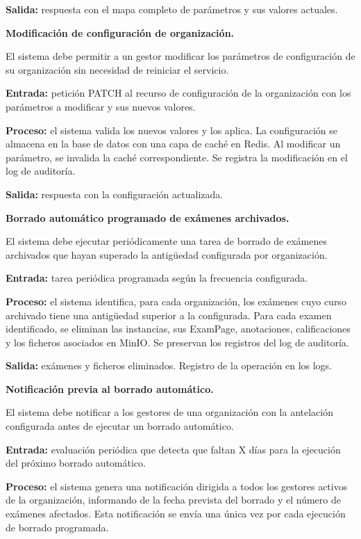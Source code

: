 \begin{functional}
\begin{functional}
    \textbf{Salida:} respuesta con el mapa completo de parámetros y sus valores actuales.

    \item \textbf{Modificación de configuración de organización.}

    El sistema debe permitir a un gestor modificar los parámetros de configuración de su organización sin necesidad de reiniciar el servicio.

    \textbf{Entrada:} petición PATCH al recurso de configuración de la organización con los parámetros a modificar y sus nuevos valores.

    \textbf{Proceso:} el sistema valida los nuevos valores y los aplica. La configuración se almacena en la base de datos con una capa de caché en Redis. Al modificar un parámetro, se invalida la caché correspondiente. Se registra la modificación en el log de auditoría.

    \textbf{Salida:} respuesta con la configuración actualizada.

    \item \textbf{Borrado automático programado de exámenes archivados.}

    El sistema debe ejecutar periódicamente una tarea de borrado de exámenes archivados que hayan superado la antigüedad configurada por organización.

    \textbf{Entrada:} tarea periódica programada según la frecuencia configurada.

    \textbf{Proceso:} el sistema identifica, para cada organización, los exámenes cuyo curso archivado tiene una antigüedad superior a la configurada. Para cada examen identificado, se eliminan las instancias, sus ExamPage, anotaciones, calificaciones y los ficheros asociados en MinIO. Se preservan los registros del log de auditoría.

    \textbf{Salida:} exámenes y ficheros eliminados. Registro de la operación en los logs.

    \item \textbf{Notificación previa al borrado automático.}

    El sistema debe notificar a los gestores de una organización con la antelación configurada antes de ejecutar un borrado automático.

    \textbf{Entrada:} evaluación periódica que detecta que faltan X días para la ejecución del próximo borrado automático.

    \textbf{Proceso:} el sistema genera una notificación dirigida a todos los gestores activos de la organización, informando de la fecha prevista del borrado y el número de exámenes afectados. Esta notificación se envía una única vez por cada ejecución de borrado programada.


\end{functional}
\end{functional}

